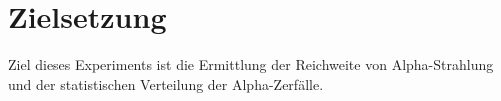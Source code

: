 \section{Zielsetzung}
\label{sec:Zielsetzung}

Ziel dieses Experiments ist die Ermittlung der Reichweite von Alpha-Strahlung
und der statistischen Verteilung der Alpha-Zerfälle.
